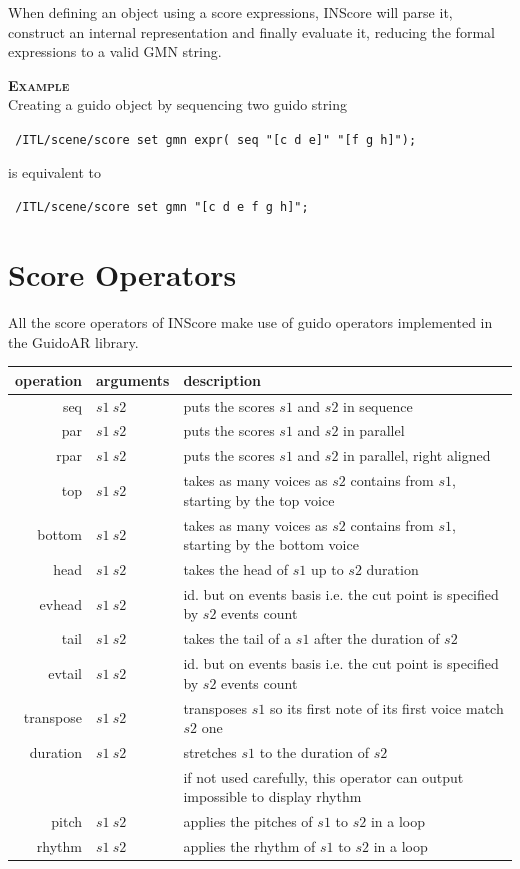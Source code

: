 \documentclass[a4paper,twoside]{report}
\newcommand{\sublevel}[1]	{\section{#1}}
\newcommand{\example}		{\textbf{\hspace{-1.5cm}\textbf{\textsc{Example }}}}
\newcommand{\sample}	[1]			{\vspace{-2mm}\begin{center}\colorbox{mygrey}{
								\begin{minipage}[t]{0.9\columnwidth} 
								{\small \texttt{#1}}
								\end{minipage}}\end{center}}
\begin{document}
When defining an object using a score expressions, INScore will parse it, construct an internal representation and finally evaluate it, reducing the formal expressions to a valid GMN string.

\example \\
Creating a guido object by sequencing two guido string
\sample{
/ITL/scene/score set gmn expr( seq "[c d e]" "[f g h]");
}
is equivalent to
\sample{
/ITL/scene/score set gmn "[c d e f g h]";
}

\sublevel{Score Operators}
\label{operators}
All the score operators of INScore make use of guido operators implemented in the GuidoAR library.
\begin{table}[htdp]
\begin{center}
\begin{tabular}{rll}
\hline
operation & arguments		&	description \\
\hline
seq 	&	$s1\ s2$		& puts the scores $s1$ and $s2$ in sequence \\
par 	&	$s1\ s2$		& puts the scores $s1$ and $s2$ in parallel \\ 
rpar	&	$s1\ s2$		& puts the scores $s1$ and $s2$ in parallel, right aligned \\
top 	&	$s1\ s2$ 	& takes as many voices as $s2$ contains from $s1$, starting by the top voice \\
bottom 	&	$s1\ s2$ 	& takes as many voices as $s2$ contains from $s1$, starting by the bottom voice  \\
head	& 	$s1\ s2$	& takes the head of $s1$ up to $s2$ duration \\
evhead 	&	$s1\ s2$	& id. but on events basis i.e. the cut point is specified by $s2$ events count \\
tail	&	$s1\ s2$ 	& takes the tail of a $s1$ after the duration of $s2$ \\
evtail 	&	$s1\ s2$ 	& id. but on events basis i.e. the cut point is specified by $s2$ events count \\
transpose 	&	$s1\ s2$	& transposes $s1$ so its first note of its first voice match $s2$ one \\
duration 	&	$s1\ s2$	& stretches $s1$ to the duration of $s2$  \\
			& 	& if not used carefully, this operator can output impossible to display rhythm\\
pitch 	&	$s1\ s2$	& applies the pitches of $s1$ to $s2$ in a loop \\
rhythm 	&	$s1\ s2$	& applies the rhythm of $s1$ to $s2$ in a loop \\
\hline
\end{tabular}
\end{center}

\end{table}
\end{document}
